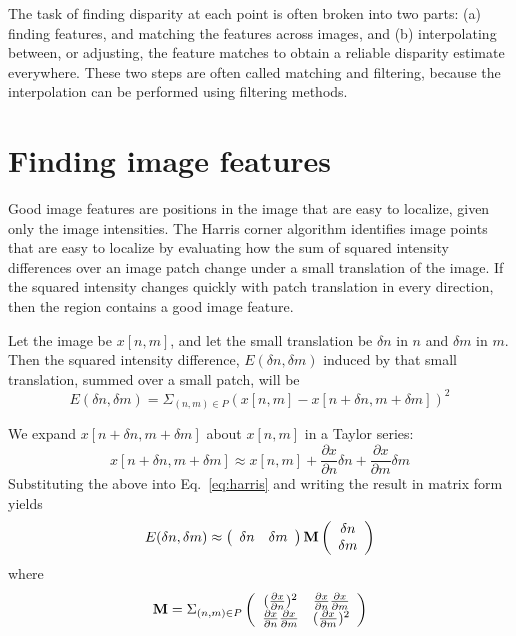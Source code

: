 The task of finding disparity at each point is often broken into two parts:  (a) finding features, and matching the features across images, and (b) interpolating between, or adjusting, the feature matches to obtain a reliable disparity estimate everywhere.
These two steps are often called matching and filtering, because the interpolation can be performed using filtering methods.



\section{Finding image features}
Good image features are positions in the image that are easy to localize, given only the image intensities. The Harris corner \cite{Harris88} algorithm identifies image points that are easy to localize by evaluating how the sum of squared intensity differences over an image patch change under a small translation of the image. If the squared intensity changes quickly with patch translation in every direction, then the region contains a good image feature. 

Let the image be $x[n,m]$, and let the small translation be $\delta n$ in $n$ and $\delta m$ in $m$.  Then the squared intensity difference, $E(\delta n, \delta m)$ induced by that small translation, summed over a small patch, will be
\begin{equation}
    E(\delta n, \delta m) = \Sigma_{(n, m) \in P}
    (x[n,m] - x[n + \delta n, m + \delta m])^2
    \label{eq:harris}
\end{equation}

We expand $x[n + \delta n, m + \delta m]$ about $x[n, m]$ in a Taylor series:
\begin{equation}
    x[n + \delta n, m + \delta m] \approx
    x[n, m] + \frac{\partial x}{\partial n} \delta n
    + \frac{\partial x}{\partial m} \delta m
\end{equation}
Substituting the above into Eq.~\ref{eq:harris} and writing the result in matrix form yields
\begin{equation}
       E(\delta n, \delta m) \approx
       \left( \begin{array}{c c}
       \delta n & \delta m
       \end{array}
       \right)
       \mathbf{M} 
       \left( \begin{array}{c}
       \delta n \\
       \delta m
       \end{array}
       \right) 
\end{equation}
where
\begin{equation}
\mathbf{M} = \Sigma_{(n, m) \in P}
\left( \begin{array}{c c}
(\frac{\partial x}{\partial n})^2 & 
\frac{\partial x}{\partial n} 
\frac{\partial x}{\partial m} \\
\frac{\partial x}{\partial n} 
\frac{\partial x}{\partial m} 
& (\frac{\partial x}{\partial m})^2
\end{array} \right)
\end{equation}

